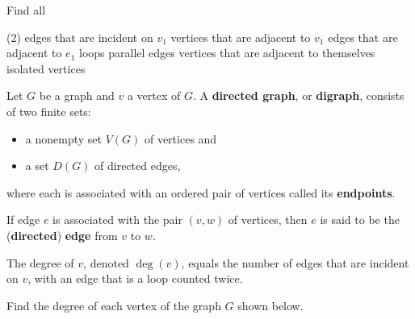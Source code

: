 \documentclass[../mathNotesPreamble]{subfiles}
\begin{document}
\begin{ex*}
\begin{center}
    \end{center}
    \noindent
    Find all
      \begin{tasks}[label=~,after-item-skip=\stretch{1}](2)
        \task edges that are incident on $v_1$
        \task vertices that are adjacent to $v_1$
        \task edges that are adjacent to $e_1$
        \task loops
        \task parallel edges
        \task vertices that are adjacent to themselves
        \task isolated vertices
      \end{tasks}
  \end{ex*}
  \pagebreak

  \begin{defn*}
    Let $G$ be a graph and $v$ a vertex of $G$. A \textbf{directed graph}, or \textbf{digraph}, consists of two finite sets: 
    \begin{itemize}
      \item a nonempty set $V(G)$ of vertices and
      \item a set $D(G)$ of directed edges,
    \end{itemize}
    where each is associated with an ordered pair of vertices called its \textbf{endpoints}. 
    
    If edge $e$ is associated with the pair $(v,w)$ of vertices, then $e$ is said to be the (\textbf{directed}) \textbf{edge} from $v$ to $w$.
    
    The degree of $v$, denoted $\operatorname{deg}(v)$, equals the number of edges that are incident on $v$, with an edge that is a loop counted twice.
  \end{defn*}
  \begin{ex*}
    Find the degree of each vertex of the graph $G$ shown below.
    \begin{center}
    \end{center}
  \end{ex*}

  \pagebreak
\end{document}
